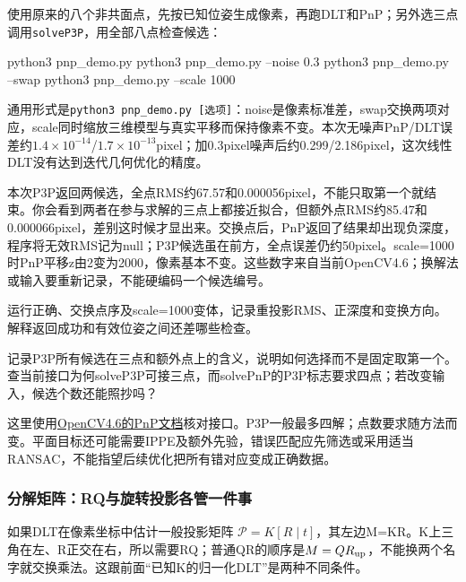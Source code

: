 \begin{example}[同一批点比较三种求解]
使用原来的八个非共面点，先按已知位姿生成像素，再跑DLT和PnP；另外选三点调用\texttt{solveP3P}，用全部八点检查候选：

\begin{tbash}
python3 pnp_demo.py
python3 pnp_demo.py --noise 0.3
python3 pnp_demo.py --swap
python3 pnp_demo.py --scale 1000
\end{tbash}
通用形式是\texttt{python3 pnp\_demo.py [选项]}：noise是像素标准差，swap交换两项对应，scale同时缩放三维模型与真实平移而保持像素不变。本次无噪声PnP/DLT误差约$1.4\times10^{-14}$/$1.7\times10^{-13}$pixel；加0.3pixel噪声后约0.299/2.186pixel，这次线性DLT没有达到迭代几何优化的精度。

本次P3P返回两候选，全点RMS约67.57和0.000056pixel，不能只取第一个就结束。你会看到两者在参与求解的三点上都接近拟合，但额外点RMS约85.47和0.000066pixel，差别这时候才显出来。交换点后，PnP返回了结果却出现负深度，程序将无效RMS记为null；P3P候选虽在前方，全点误差仍约50pixel。scale=1000时PnP平移z由2变为2000，像素基本不变。这些数字来自当前OpenCV4.6；换解法或输入要重新记录，不能硬编码一个候选编号。
\end{example}
\begin{exercise}\label{ex:v2-ba-pnp}
运行正确、交换点序及scale=1000变体，记录重投影RMS、正深度和变换方向。解释返回成功和有效位姿之间还差哪些检查。
\end{exercise}
\begin{exercise}\label{ex:v2-ba-p3p}
记录P3P所有候选在三点和额外点上的含义，说明如何选择而不是固定取第一个。查当前接口为何solveP3P可接三点，而solvePnP的P3P标志要求四点；若改变输入，候选个数还能照抄吗？
\end{exercise}
\begin{note}
这里使用\href{https://docs.opencv.org/4.6.0/d5/d1f/calib3d_solvePnP.html}{OpenCV4.6的PnP文档}核对接口。P3P一般最多四解；点数要求随方法而变。平面目标还可能需要IPPE及额外先验，错误匹配应先筛选或采用适当RANSAC，不能指望后续优化把所有错对应变成正确数据。
\end{note}

\subsubsection{分解矩阵：RQ与旋转投影各管一件事}
\label{sec:DLT的QR求解}
如果DLT在像素坐标中估计一般投影矩阵 $\mathcal P=K[R\mid t]$，其左边M=KR。K上三角在左、R正交在右，所以需要RQ；普通QR的顺序是$M=Q R_{\rm up}$，不能换两个名字就交换乘法。这跟前面“已知K的归一化DLT”是两种不同条件。

